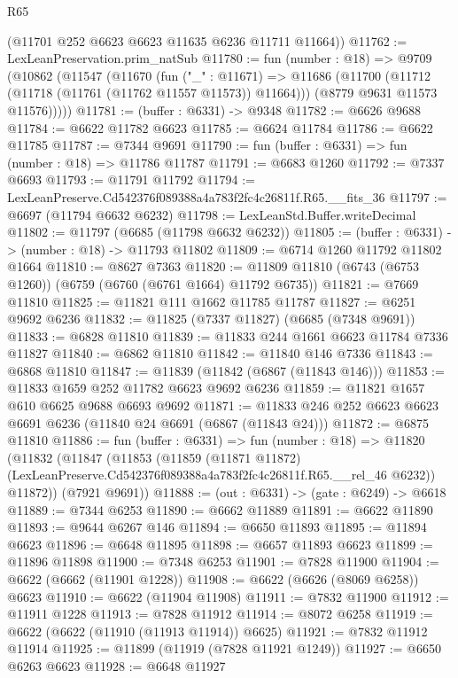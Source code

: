 \begin{lexlean}{R65}
\begin{coremodule}
{      (@11701 @252 @6623 @6623 @11635 @6236 @11711 @11664))
@11762 := LexLeanPreservation.prim_natSub
@11780 := fun (number : @18) =>
  @9709
    (@10862
      (@11547
        (@11670
          (fun ("_" : @11671) =>
          @11686
            (@11700 (@11712 (@11718 (@11761 (@11762 @11557 @11573)) @11664)))
            (@8779 @9631 @11573 @11576)))))
@11781 := (buffer : @6331) -> @9348
@11782 := @6626 @9688
@11784 := @6622 @11782 @6623
@11785 := @6624 @11784
@11786 := @6622 @11785
@11787 := @7344 @9691
@11790 := fun (buffer : @6331) => fun (number : @18) => @11786 @11787
@11791 := @6683 @1260
@11792 := @7337 @6693
@11793 := @11791 @11792
@11794 := LexLeanPreserve.Cd542376f089388a4a783f2fc4c26811f.R65.__fits_36
@11797 := @6697 (@11794 @6632 @6232)
@11798 := LexLeanStd.Buffer.writeDecimal
@11802 := @11797 (@6685 (@11798 @6632 @6232))
@11805 := (buffer : @6331) -> (number : @18) -> @11793 @11802
@11809 := @6714 @1260 @11792 @11802 @1664
@11810 := @8627 @7363
@11820 := @11809 @11810 (@6743 (@6753 @1260)) (@6759 (@6760 (@6761 @1664) @11792 @6735))
@11821 := @7669 @11810
@11825 := @11821 @111 @1662 @11785 @11787
@11827 := @6251 @9692 @6236
@11832 := @11825 (@7337 @11827) (@6685 (@7348 @9691))
@11833 := @6828 @11810
@11839 := @11833 @244 @1661 @6623 @11784 @7336 @11827
@11840 := @6862 @11810
@11842 := @11840 @146 @7336
@11843 := @6868 @11810
@11847 := @11839 (@11842 (@6867 (@11843 @146)))
@11853 := @11833 @1659 @252 @11782 @6623 @9692 @6236
@11859 := @11821 @1657 @610 @6625 @9688 @6693 @9692
@11871 := @11833 @246 @252 @6623 @6623 @6691 @6236 (@11840 @24 @6691 (@6867 (@11843 @24)))
@11872 := @6875 @11810
@11886 := fun (buffer : @6331) =>
  fun (number : @18) =>
  @11820
    (@11832
      (@11847
        (@11853
          (@11859
            (@11871 @11872)
            (LexLeanPreserve.Cd542376f089388a4a783f2fc4c26811f.R65.__rel_46 @6232))
          @11872))
      (@7921 @9691))
@11888 := (out : @6331) -> (gate : @6249) -> @6618
@11889 := @7344 @6253
@11890 := @6662 @11889
@11891 := @6622 @11890
@11893 := @9644 @6267 @146
@11894 := @6650 @11893
@11895 := @11894 @6623
@11896 := @6648 @11895
@11898 := @6657 @11893 @6623
@11899 := @11896 @11898
@11900 := @7348 @6253
@11901 := @7828 @11900
@11904 := @6622 (@6662 (@11901 @1228))
@11908 := @6622 (@6626 (@8069 @6258)) @6623
@11910 := @6622 (@11904 @11908)
@11911 := @7832 @11900
@11912 := @11911 @1228
@11913 := @7828 @11912
@11914 := @8072 @6258
@11919 := @6622 (@6622 (@11910 (@11913 @11914)) @6625)
@11921 := @7832 @11912 @11914
@11925 := @11899 (@11919 (@7828 @11921 @1249))
@11927 := @6650 @6263 @6623
@11928 := @6648 @11927
}
\end{coremodule}
\end{lexlean}
